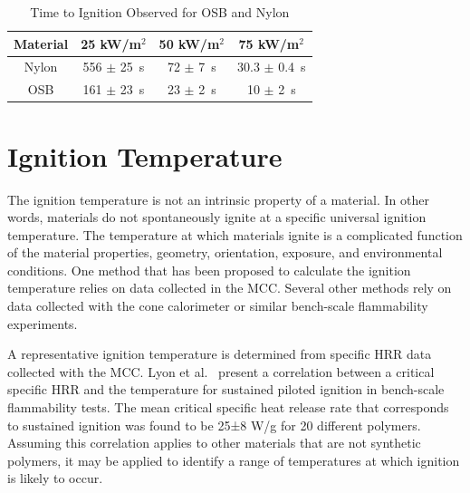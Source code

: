 \documentclass[12pt,oneside]{book}
\begin{document}
\begin{table}[!ht]{}
\centering
\caption[Time to Ignition Observed for OSB and Nylon]{Time to Ignition Observed for OSB and Nylon}
{\begin{tabular}{cccc}
\toprule
Material 	& 25 kW/m$^2$		& 50 kW/m$^2$ 		& 75 kW/m$^2$  \\
\midrule
Nylon 		& 556 $\pm$ 25~s	& 72 $\pm$ 7~s		& 30.3 $\pm$ 0.4~s  \\ 
OSB 		& 161 $\pm$ 23~s 	& 23 $\pm$ 2~s		& 10 $\pm$ 2~s  \\
\bottomrule
\end{tabular}}
\label{tab:tti}
\end{table}

\section{Ignition Temperature}

The ignition temperature is not an intrinsic property of a material. In other words, materials do not spontaneously ignite at a specific universal ignition temperature. The temperature at which materials ignite is a complicated function of the material properties, geometry, orientation, exposure, and environmental conditions. One method that has been proposed to calculate the ignition temperature relies on data collected in the MCC. Several other methods rely on data collected with the cone calorimeter or similar bench-scale flammability experiments. 

A representative ignition temperature is determined from specific HRR data collected with the MCC. Lyon et al.~\cite{Lyon_2018} present a correlation between a critical specific HRR and the temperature for sustained piloted ignition in bench-scale flammability tests. The mean critical specific heat release rate that corresponds to sustained ignition was found to be 25±8 W/g for 20 different polymers. Assuming this correlation applies to other materials that are not synthetic polymers, it may be applied to identify a range of temperatures at which ignition is likely to occur.
\end{document}
